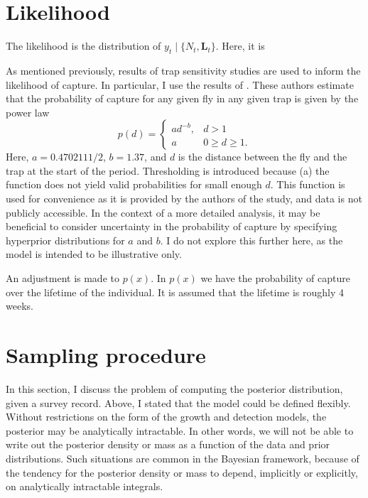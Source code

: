 \documentclass[
  oneside]{book}
\begin{document}
\hypertarget{likelihood}{%
\section{Likelihood}\label{likelihood}}

The likelihood is the distribution of \(y_t \mid \{N_t, \mathbf L_t\}\). Here, it is

As mentioned previously, results of trap sensitivity studies are used to inform the likelihood of capture. In particular, I use the results of \citet{ms2005}. These authors estimate that the probability of capture for any given fly in any given trap is given by the power law
\[
p(d) = \begin{cases}ad^{-b}, & d>1 \\ a & 0 \geq d \geq 1.\end{cases}
\]
Here, \(a = 0.4702111 / 2\), \(b = 1.37\), and \(d\) is the distance between the fly and the trap at the start of the period. Thresholding is introduced because (a) the function does not yield valid probabilities for small enough \(d\). This function is used for convenience as it is provided by the authors of the study, and data is not publicly accessible. In the context of a more detailed analysis, it may be beneficial to consider uncertainty in the probability of capture by specifying hyperprior distributions for \(a\) and \(b\). I do not explore this further here, as the model is intended to be illustrative only.

An adjustment is made to \(p(x)\). In \(p(x)\) we have the probability of capture over the lifetime of the individual. It is assumed that the lifetime is roughly 4 weeks.

\hypertarget{sampling-procedure}{%
\section{Sampling procedure}\label{sampling-procedure}}

In this section, I discuss the problem of computing the posterior distribution, given a survey record. Above, I stated that the model could be defined flexibly. Without restrictions on the form of the growth and detection models, the posterior may be analytically intractable. In other words, we will not be able to write out the posterior density or mass as a function of the data and prior distributions. Such situations are common in the Bayesian framework, because of the tendency for the posterior density or mass to depend, implicitly or explicitly, on analytically intractable integrals.
\end{document}
